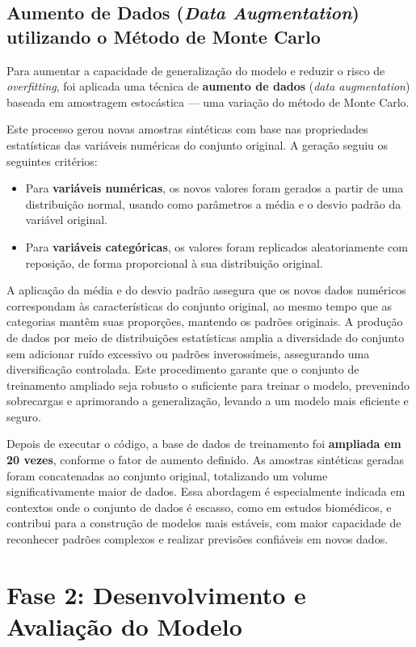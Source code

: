 \subsection*{Aumento de Dados (\textit{Data Augmentation}) utilizando o Método de Monte Carlo} 
Para aumentar a capacidade de generalização do modelo e reduzir o risco de \textit{overfitting}, foi aplicada uma técnica de \textbf{aumento de dados} (\textit{data augmentation}) baseada em amostragem estocástica — uma variação do método de Monte Carlo.

Este processo gerou novas amostras sintéticas com base nas propriedades estatísticas das variáveis numéricas do conjunto original. A geração seguiu os seguintes critérios:
\begin{itemize}
    \item Para \textbf{variáveis numéricas}, os novos valores foram gerados a partir de uma distribuição normal, usando como parâmetros a média e o desvio padrão da variável original.
    \item Para \textbf{variáveis categóricas}, os valores foram replicados aleatoriamente com reposição, de forma proporcional à sua distribuição original.
\end{itemize}

A aplicação da média e do desvio padrão assegura que os novos dados numéricos correspondam às características do conjunto original, ao mesmo tempo que as categorias mantêm suas proporções, mantendo os padrões originais. A produção de dados por meio de distribuições estatísticas amplia a diversidade do conjunto sem adicionar ruído excessivo ou padrões inverossímeis, assegurando uma diversificação controlada. Este procedimento garante que o conjunto de treinamento ampliado seja robusto o suficiente para treinar o modelo, prevenindo sobrecargas e aprimorando a generalização, levando a um modelo mais eficiente e seguro.

Depois de executar o código, a base de dados de treinamento foi  \textbf{ampliada em 20 vezes}, conforme o fator de aumento definido. As amostras sintéticas geradas foram concatenadas ao conjunto original, totalizando um volume significativamente maior de dados. Essa abordagem é especialmente indicada em contextos onde o conjunto de dados é escasso, como em estudos biomédicos, e contribui para a construção de modelos mais estáveis, com maior capacidade de reconhecer padrões complexos e realizar previsões confiáveis em novos dados.

\section{Fase 2: Desenvolvimento e Avaliação do Modelo}
